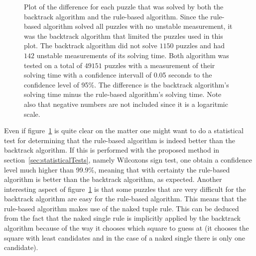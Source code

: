 \documentclass[a4paper,11pt]{kth-mag}
\begin{document}
\begin{figure}[here] 
\noindent{}
\vspace{-15pt}
\caption[Plot of puzzle difference between solvers]{Plot of the difference for each puzzle that was solved by both the backtrack algorithm and the rule-based algorithm. Since the rule-based algorithm solved all puzzles with no unstable measurement, it was the backtrack algorithm that limited the puzzles used in this plot. The backtrack algorithm did not solve $1150$ puzzles and had $142$ unstable measurements of its solving time. Both algorithm was tested on a total of $49151$ puzzles with a measurement of their solving time with a confidence intervall of 0.05 seconds to the confidence level of 95\%.
The difference is the backtrack algorithm's solving time minus the rule-based algorithm's solving time. Note also that negative numbers are not included since it is a logaritmic scale.}
\label{fig:comparison}
\end{figure}

Even if figure~\ref{fig:comparison} is quite clear on the matter one might want to do a statistical test for determining that the rule-based algorithm is indeed better than the backtrack algorithm.
If this is performed with the proposed method in section~\ref{sec:statisticalTests}, namely Wilcoxons sign test, one obtain a confidence level much higher than 99.9\%, meaning that with certainty the rule-based algorithm is better than the backtrack algorithm, as expected.
Another interesting aspect of figure~\ref{fig:comparison} is that some puzzles that are very difficult for the backtrack algorithm are easy for the rule-based algorithm.
This means that the rule-based algorithm makes use of the naked tuple rule.
This can be deduced from the fact that the naked single rule is implicitly applied by the backtrack algorithm because of the way it chooses which square to guess at (it chooses the square with least candidates and in the case of a naked single there is only one candidate).
\end{document}

